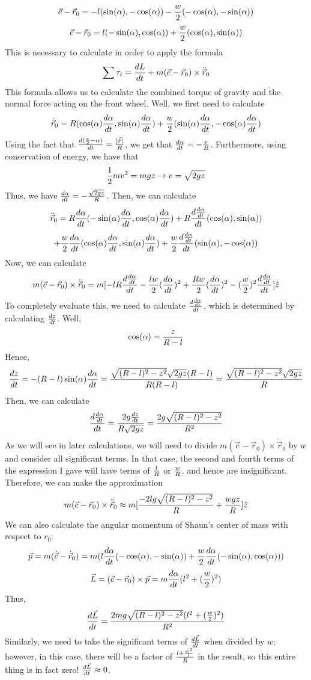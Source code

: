$$\vec c-\vec r_0=-l(\sin(\alpha), -\cos(\alpha))-\frac{w}{2}(-\cos(\alpha), -\sin(\alpha))$$
$$\vec c-\vec r_0=l(-\sin(\alpha), \cos(\alpha))+\frac w 2(\cos(\alpha), \sin(\alpha))$$
This is necessary to calculate in order to apply the formula
$$\sum \tau_i=\frac{dL}{dt}+m(\vec c-\vec r_0)\times \ddot {\vec r}_0$$
This formula allows us to calculate the combined torque of gravity and the normal force acting on the front wheel.  Well, we first need to calculate
$$\dot{\vec r}_0=R(\cos(\alpha)\frac{d\alpha}{dt}, \sin(\alpha)\frac{d\alpha}{dt})+\frac w 2(\sin(\alpha)\frac{d\alpha}{dt}, -\cos(\alpha)\frac{d\alpha}{dt})$$
Using the fact that $\frac{d(\frac \pi 2-\alpha)}{dt}=\frac{|\vec {\dot r}|}{R}$, we get that $\frac{d\alpha}{dt}=-\frac {v} R$.  Furthermore, using conservation of energy, we have that
$$\frac 1 2 m v^2=mgz\rightarrow v=\sqrt {2gz}$$
Thus, we have $\frac{d\alpha}{dt}=-\frac{\sqrt {2gz}}R$.  Then, we can calculate
$$\ddot{\vec r}_0=R\frac{d\alpha}{dt}(-\sin(\alpha)\frac{d\alpha}{dt}, \cos(\alpha) \frac{d\alpha}{dt})+R \frac{d\frac{d\alpha}{dt}}{dt}(\cos(\alpha), \sin(\alpha))$$
$$+\frac w 2 \frac{d\alpha}{dt} (\cos(\alpha) \frac{d\alpha}{dt}, \sin(\alpha) \frac{d\alpha}{dt})+\frac w 2 \frac{d\frac{d\alpha}{dt}}{dt}(\sin(\alpha), -\cos(\alpha))$$
Now, we can calculate
$$m(\vec c-\vec r_0)\times \ddot {\vec r}_0=m[-l R \frac{d\frac{d\alpha}{dt}}{dt}-\frac{lw}{2}(\frac{d\alpha}{dt})^2+\frac {Rw}{2}(\frac{d\alpha}{dt})^2-(\frac w 2)^2 \frac{d\frac{d\alpha}{dt}}{dt}]\hat z$$
To completely evaluate this, we need to calculate $\frac{d\frac{d\alpha}{dt}}{dt}$, which is determined by calculating $\frac{dz}{dt}$.  Well, 
$$\cos(\alpha)=\frac{z}{R-l}$$
Hence, $$\frac{dz}{dt}=-(R-l)\sin(\alpha) \frac{d\alpha}{dt}=\frac{\sqrt{(R-l)^2-z^2}\sqrt{2gz}(R-l)}{R(R-l)}=\frac{\sqrt{(R-l)^2-z^2}\sqrt{2gz}}{R}$$
Then, we can calculate
$$\frac{d\frac{d\alpha}{dt}}{dt}=\frac {2g \frac{dz}{dt}}{R\sqrt{2gz}}=\frac {2g \sqrt{(R-l)^2-z^2}}{R^2}$$
As we will see in later calculations, we will need to divide $m(\vec c-\vec r_0)\times \ddot {\vec r}_0$ by $w$ and consider all significant terms.  In that case, the second and fourth terms of the expression I gave will have terms of $\frac{l}{R}$ or $\frac{w}{R}$, and hence are insignificant.  Therefore, we can make the approximation
$$m(\vec c-\vec r_0)\times \ddot {\vec r}_0\approx m[\frac{-2lg\sqrt{(R-l)^2-z^2}}{R}+\frac{wgz}{R}]\hat z$$
We can also calculate the angular momentum of Shaun's center of mass with respect to $r_0$:
$$\vec p=m(\dot{\vec c}-\dot{\vec r}_0)=m(l\frac{d\alpha}{dt}(-\cos(\alpha), -\sin(\alpha))+\frac w 2 \frac{d\alpha}{dt}(-\sin(\alpha), \cos(\alpha)))$$
$$\vec L=(\vec c-\vec r_0)\times \vec p=m\frac{d\alpha}{dt}(l^2+(\frac w 2)^2)$$
Thus, 
$$\frac{d\vec L}{dt}=\frac{2mg\sqrt{(R-l)^2-z^2}(l^2+(\frac w 2)^2)}{R^2}$$
Similarly, we need to take the significant terms of $\frac{d\vec L}{dt}$ when divided by $w$; however, in this case, there will be a factor of $\frac{l+\frac{w^2}{l}}{R}$ in the result, so this entire thing is in fact zero!  $\frac{d\vec L}{dt}\approx 0$.
